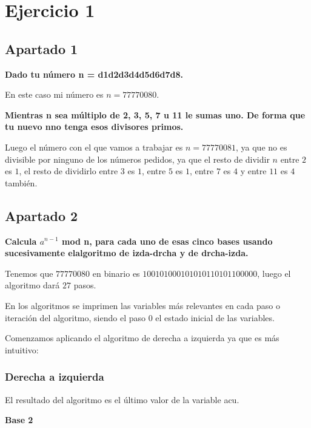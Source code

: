 \documentclass[a4paper]{article}
\title {\fbox{\Huge{\textbf{Ejercicio 1}}}}
\author {\fbox{Ana Buendía Ruiz-Azuaga}}
\begin{document}
\maketitle


\section{Ejercicio 1}
\subsection{Apartado 1}
\textbf{Dado tu número n = d1d2d3d4d5d6d7d8.}

En este caso mi número es $n=77770080$.

\textbf{Mientras n sea múltiplo de 2, 3, 5, 7 u 11 le sumas uno. De forma que tu nuevo nno tenga esos divisores primos.}

Luego el número con el que vamos a trabajar es $n=77770081$, ya que no es divisible por ninguno de los números pedidos, ya que el resto de dividir $n$ entre $2$ es $1$, el resto de dividirlo entre $3$ es $1$, entre $5$ es $1$, entre $7$ es $4$ y entre $11$ es $4$ también.

\subsection{Apartado 2}
\textbf{Calcula $a^{n-1}$ mod n, para cada uno de esas cinco bases usando sucesivamente elalgoritmo de izda-drcha y de drcha-izda.}

Tenemos que $77770080$ en binario es $100101000101010110101100000$, luego el algoritmo dará $27$ pasos.

En los algoritmos se imprimen las variables más relevantes en cada paso o iteración del algoritmo, siendo el paso 0 el estado inicial de las variables.

Comenzamos aplicando el algoritmo de derecha a izquierda ya que es más intuitivo:

\subsubsection{Derecha a izquierda}

El resultado del algoritmo es el último valor de la variable acu.

\textbf{Base 2}
\end{document}
